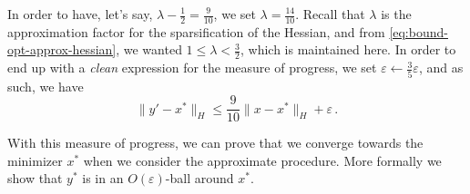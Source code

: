 In order to have, let's say, $\lambda - \frac{1}{2} = \frac{9}{10}$, we set
$\lambda = \frac{14}{10}$. Recall that $\lambda$ is the approximation factor for
the sparsification of the Hessian, and from
\autoref{eq:bound-opt-approx-hessian}, we wanted $1 \leq \lambda < \frac{3}{2}
$, which is maintained here. In order to end up with a \emph{clean} expression
for the measure of progress, we set $\varepsilon \leftarrow \frac{3}{5}
\varepsilon$, and as such, we have
\begin{equation*}
        \| y' - x^* \|_H \leq \frac{9}{10}\|x - x^*\|_H + \varepsilon \, .
\end{equation*}

With this measure of progress, we can prove that we converge towards the
minimizer $x^*$ when we consider the approximate procedure. More formally we
show that $y^*$ is in an $O(\varepsilon)$-ball around $x^*$.